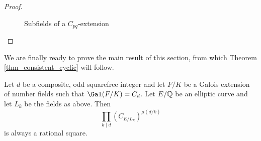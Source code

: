 \begin{proof}
\begin{figure}[!ht]
        \caption[short]{Subfields of a $C_{pq}$-extension}
    \end{figure}
\end{proof}

We are finally ready to prove the main result of this section, from which Theorem \ref*{thm_consistent_cyclic} will follow. 

\begin{lemma}\label{lem_Cd_odd}
    Let $d$ be a composite, odd squarefree integer and let $F/K$ be a Galois extension of number fields such that $\Gal(F/K)=C_{d}$. Let $E/\mathbb{Q}$ be an elliptic curve and let $L_k$ be the fields as above. Then
    $$\prod_{k\mid d}(C_{E/L_k})^{\mu(d/k)}$$
    is always a rational square.
\end{lemma}

